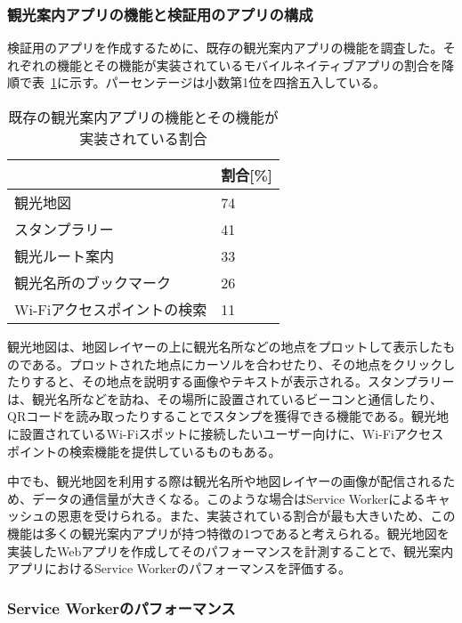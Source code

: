 \subsubsection{観光案内アプリの機能と検証用のアプリの構成}\label{subsubsection:観光案内アプリに求められる機能と検証用のアプリの構成}
検証用のアプリを作成するために、既存の観光案内アプリの機能を調査した。それぞれの機能とその機能が実装されているモバイルネイティブアプリの割合を降順で表~\ref{table:既存の観光案内アプリの機能とその機能が実装されている割合}に示す。パーセンテージは小数第1位を四捨五入している。
\begin{table}
  \centering
  \begin{tabular}{|p{15em}|p{10em}|}
    \hline
    & 割合[\%] \\ \hline
    観光地図 & 74 \\ \hline
    スタンプラリー & 41\\ \hline
    観光ルート案内 & 33\\ \hline
    観光名所のブックマーク & 26\\ \hline
    Wi-Fiアクセスポイントの検索 & 11 \\ \hline
  \end{tabular}
  \caption{既存の観光案内アプリの機能とその機能が実装されている割合}\label{table:既存の観光案内アプリの機能とその機能が実装されている割合}
\end{table}
観光地図は、地図レイヤーの上に観光名所などの地点をプロットして表示したものである。プロットされた地点にカーソルを合わせたり、その地点をクリックしたりすると、その地点を説明する画像やテキストが表示される。スタンプラリーは、観光名所などを訪ね、その場所に設置されているビーコンと通信したり、QRコードを読み取ったりすることでスタンプを獲得できる機能である。観光地に設置されているWi-Fiスポットに接続したいユーザー向けに、Wi-Fiアクセスポイントの検索機能を提供しているものもある。

中でも、観光地図を利用する際は観光名所や地図レイヤーの画像が配信されるため、データの通信量が大きくなる。このような場合はService Workerによるキャッシュの恩恵を受けられる。また、実装されている割合が最も大きいため、この機能は多くの観光案内アプリが持つ特徴の1つであると考えられる。観光地図を実装したWebアプリを作成してそのパフォーマンスを計測することで、観光案内アプリにおけるService Workerのパフォーマンスを評価する。


\subsubsection{Service Workerのパフォーマンス}\label{subsubsection:Service Workerのパフォーマンス}